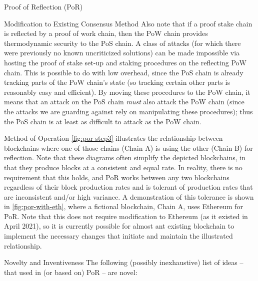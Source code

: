 \documentclass[a4paper,]{article}
\begin{document}
\begin{section}{Proof of Reflection (PoR)}
\begin{subsection}{Modification to Existing Consensus Method}
    Also note that if a proof stake chain is reflected by a proof of work chain, then the PoW chain provides thermodynamic security to the PoS chain. A class of attacks (for which there were previously no known uncriticized solutions) can be made impossible via hosting the proof of stake set-up and staking procedures on the reflecting PoW chain. This is possible to do with low overhead, since the PoS chain is already tracking parts of the PoW chain's state (so tracking certain other parts is reasonably easy and efficient). By moving these procedures to the PoW chain, it means that an attack on the PoS chain \emph{must} also attack the PoW chain (since the attacks we are guarding against rely on manipulating these procedures); thus the PoS chain is at least as difficult to attack as the PoW chain.

 \end{subsection}
 \begin{subsection}{Method of Operation}
     \autoref{fig:por-step3} illustrates the relationship between blockchains where one of those chains (Chain A) is using the other (Chain B) for reflection.
     Note that these diagrams often simplify the depicted blockchains, in that they produce blocks at a consistent and equal rate.
     In reality, there is no requirement that this holds, and PoR works between any two blockchains regardless of their block production rates and is tolerant of production rates that are inconsistent and/or high variance.
     A demonstration of this tolerance is shown in \autoref{fig:por-with-eth}, where a fictional blockchain, Chain A, uses Ethereum for PoR.
     Note that this does not require modification to Ethereum (as it existed in April 2021), so it is currently possible for almost ant existing blockchain to implement the necessary changes that initiate and maintain the illustrated relationship.
 \end{subsection}
 \begin{subsection}{Novelty and Inventiveness}
    The following (possibly inexhaustive) list of ideas -- that used in (or based on) PoR -- are novel:


\end{subsection}
\end{section}
\end{document}
